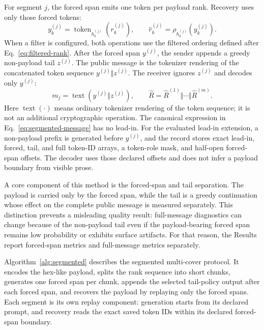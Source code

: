 \documentclass[fleqn,10pt]{wlscirep}
\begin{document}
For segment \(j\), the forced span emits one token per payload rank. Recovery uses only those forced tokens:
\begin{equation}
y^{(j)}_k=
\operatorname{token}_{h^{(j)}_k}\left(r^{(j)}_k\right),
\qquad
\hat r^{(j)}_k=
\rho_{h^{(j)}_k}\left(y^{(j)}_k\right).
\label{eq:segmented-forced-span}
\end{equation}
When a filter is configured, both operations use the filtered ordering defined after Eq.~\eqref{eq:filtered-rank}. After the forced span \(y^{(j)}\), the sender appends a greedy non-payload tail \(z^{(j)}\). The public message is the tokenizer rendering of the concatenated token sequence \(y^{(j)}\Vert z^{(j)}\). The receiver ignores \(z^{(j)}\) and decodes only \(y^{(j)}\):
\begin{equation}
m_j=\operatorname{text}\left(y^{(j)}\Vert z^{(j)}\right),
\qquad
\hat R=\hat R^{(1)}\Vert\cdots\Vert\hat R^{(m)}.
\label{eq:segmented-message}
\end{equation}
Here \(\operatorname{text}(\cdot)\) means ordinary tokenizer rendering of the token sequence; it is not an additional cryptographic operation. The canonical expression in Eq.~\eqref{eq:segmented-message} has no lead-in. For the evaluated lead-in extension, a non-payload prefix is generated before \(y^{(j)}\), and the record stores exact lead-in, forced, tail, and full token-ID arrays, a token-role mask, and half-open forced-span offsets. The decoder uses those declared offsets and does not infer a payload boundary from visible prose.

A core component of this method is the forced-span and tail separation. The payload is carried only by the forced span, while the tail is a greedy continuation whose effect on the complete public message is measured separately. This distinction prevents a misleading quality result: full-message diagnostics can change because of the non-payload tail even if the payload-bearing forced span remains low probability or exhibits surface artifacts. For that reason, the Results report forced-span metrics and full-message metrics separately.

Algorithm~\ref{alg:segmented} describes the segmented multi-cover protocol. It encodes the hex-like payload, splits the rank sequence into short chunks, generates one forced span per chunk, appends the selected tail-policy output after each forced span, and recovers the payload by replaying only the forced spans. Each segment is its own replay component: generation starts from its declared prompt, and recovery reads the exact saved token IDs within its declared forced-span boundary.
\end{document}
